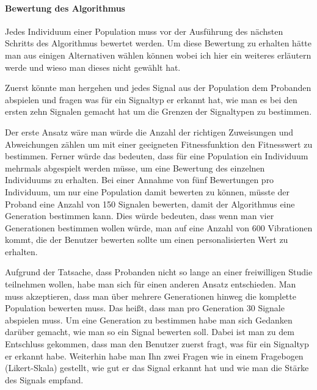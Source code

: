 \paragraph{Bewertung des Algorithmus}

Jedes Individuum einer Population muss vor der Ausf{\"u}hrung des n{\"a}chsten Schritts des Algorithmus bewertet werden.
Um diese Bewertung zu erhalten h{\"a}tte man aus einigen Alternativen w{\"a}hlen k{\"o}nnen wobei ich hier ein weiteres erl{\"a}utern werde und wieso man dieses nicht gew{\"a}hlt hat. 

Zuerst k{\"o}nnte man hergehen und jedes Signal aus der Population dem Probanden abspielen und fragen was f{\"u}r ein Signaltyp er erkannt hat, wie man es bei den ersten zehn Signalen gemacht hat um die Grenzen der Signaltypen zu bestimmen. 

Der erste Ansatz w{\"a}re man w{\"u}rde die Anzahl der richtigen Zuweisungen und Abweichungen z{\"a}hlen um mit einer geeigneten Fitnessfunktion den Fitnesswert zu bestimmen. Ferner w{\"u}rde das bedeuten, dass f{\"u}r eine Population ein Individuum mehrmals abgespielt werden m{\"u}sse, um eine Bewertung des einzelnen Individuums zu erhalten. Bei einer Annahme von f{\"u}nf Bewertungen pro Individuum, um nur eine Population damit bewerten zu k{\"o}nnen, m{\"u}sste der Proband eine Anzahl von 150 Signalen bewerten, damit der Algorithmus eine Generation bestimmen kann. Dies w{\"u}rde bedeuten, dass wenn man vier Generationen bestimmen wollen w{\"u}rde, man auf eine Anzahl von 600 Vibrationen kommt, die der Benutzer bewerten sollte um einen personalisierten Wert zu erhalten. 

Aufgrund der Tatsache, dass Probanden nicht so lange an einer freiwilligen Studie teilnehmen wollen, habe man sich f{\"u}r einen anderen Ansatz entschieden. Man muss akzeptieren, dass man {\"u}ber mehrere Generationen hinweg die komplette Population bewerten muss. Das hei{\ss}t, dass man pro Generation 30 Signale abspielen muss. Um eine Generation zu bestimmen habe man sich Gedanken dar{\"u}ber gemacht, wie man so ein Signal bewerten soll. Dabei ist man zu dem Entschluss gekommen, dass man den Benutzer zuerst fragt, was f{\"u}r ein Signaltyp er erkannt habe. Weiterhin habe man Ihn zwei Fragen wie in einem Fragebogen (Likert-Skala) gestellt, wie gut er das Signal erkannt hat und wie man die St{\"a}rke des Signals empfand. 

